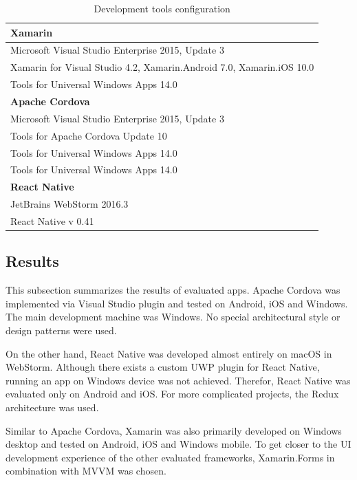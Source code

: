 \documentclass[english,master,public,dept460,male,cpdeclaration,oneside]{diploma}
\begin{document}
\begin{table}[!h]
	\centering
	\caption{Development tools configuration}
	\label{table:developmentToolsConfiguration}
	\begin{tabular}{l}
		\toprule
		\textbf{Xamarin}\\
		\midrule
		Microsoft Visual Studio Enterprise 2015, Update 3 \\
		Xamarin for Visual Studio 4.2, Xamarin.Android 7.0, Xamarin.iOS 10.0 \\
		Tools for Universal Windows Apps 14.0 \\
		\midrule
		\textbf{Apache Cordova}\\
		\midrule
		Microsoft Visual Studio Enterprise 2015, Update 3 \\
		Tools for Apache Cordova Update 10 \\
		Tools for Universal Windows Apps 14.0 \\
		Tools for Universal Windows Apps 14.0 \\
		\midrule
		\textbf{React Native}\\
		\midrule
		JetBrains WebStorm 2016.3 \\
		React Native v 0.41\\	
		\midrule	
	\end{tabular}
\end{table}

\subsection{Results}

This subsection summarizes the results of evaluated apps. Apache Cordova was implemented via Visual Studio plugin and tested on Android, iOS and Windows. The main development machine was Windows. No special architectural style or design patterns were used.

On the other hand, React Native was developed almost entirely on macOS in WebStorm. Although there exists a custom UWP plugin for React Native, running an app on Windows device was not achieved. Therefor, React Native was evaluated only on Android and iOS. For more complicated projects, the Redux architecture was used. 

Similar to Apache Cordova, Xamarin was also primarily developed on Windows desktop and tested on Android, iOS and Windows mobile. To get closer to the UI development experience of the other evaluated frameworks, Xamarin.Forms in combination with MVVM was chosen.
\end{document}
